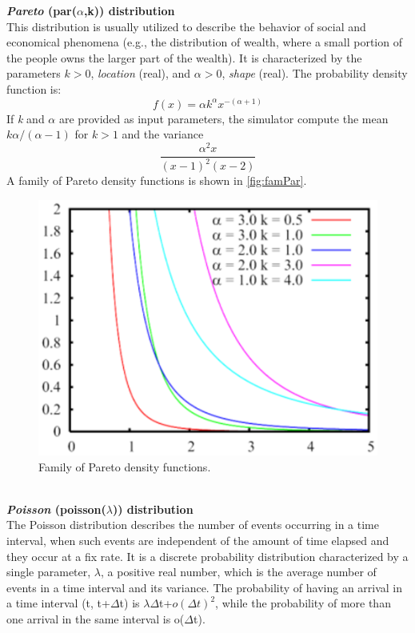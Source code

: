 \textbf{\emph{Pareto} (par($\alpha$,k)) distribution}\\
 This
distribution is usually utilized to describe the behavior of
social and economical phenomena (e.g., the distribution of wealth,
where a small portion of the people owns the larger part of the
wealth). It is characterized by the parameters $k>0$, \emph{location}
(real), and $\alpha>0$, \emph{shape} (real). The probability density
function is:
\[ f(x) = \alpha k^\alpha x^{-(\alpha + 1)  }
\]
If \emph{k} and $\alpha$ are provided as input parameters, the simulator
compute the mean  $k \alpha/(\alpha - 1)$ for $k>1$ and the
variance
\[ \frac{\alpha^2 x }{(x-1)^2 (x-2)}
\]
A family of Pareto density functions is shown in
\autoref{fig:famPar}.
\begin{figure}[htb]
    \begin{center}
        \includegraphics[scale=.5]{img/jsimg/4.10.eps}
    \end{center}
    \caption{Family of Pareto density functions.}
    \label{fig:famPar}
\end{figure}\\

\textbf{\emph{Poisson} (poisson($\lambda$)) distribution}\\
The Poisson distribution describes the number of events occurring
in a time interval, when such events are independent of the amount
of time elapsed and they occur at a fix rate. It is a discrete
probability distribution characterized by a single parameter,
$\lambda$, a positive real number, which is the average number of
events in a time interval and its variance. The probability of
having an arrival in a time interval (t, t+$\Delta$t) is $\lambda
\Delta$t+{$o(\Delta t)^2$}, while the probability of more than one
arrival in the same interval is o($\Delta$t).

